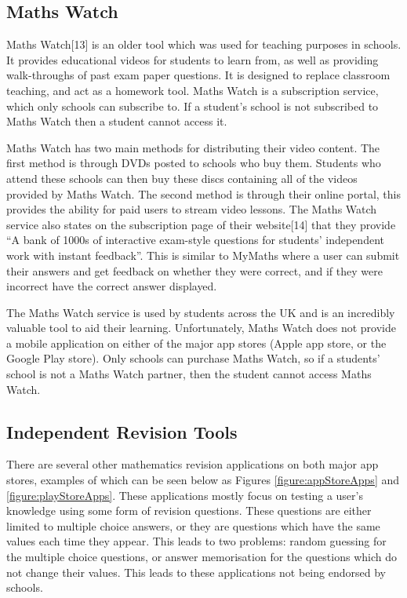 \documentclass{article}
\begin{document}
\subsection{Maths Watch}

Maths Watch[13] is an older tool which was used for teaching purposes in schools. It provides educational videos for students to learn from, as well as providing walk-throughs of past exam paper questions. It is designed to replace classroom teaching, and act as a homework tool. Maths Watch is a subscription service, which only schools can subscribe to. If a student's school is not subscribed to Maths Watch then a student cannot access it. \par

Maths Watch has two main methods for distributing their video content. The first method is through DVDs posted to schools who buy them. Students who attend these schools can then buy these discs containing all of the videos provided by Maths Watch. The second method is through their online portal, this provides the ability for paid users to stream video lessons. The Maths Watch service also states on the subscription page of their website[14] that they provide ``A bank of 1000s of interactive exam-style questions for students' independent work with instant feedback''. This is similar to MyMaths where a user can submit their answers and get feedback on whether they were correct, and if they were incorrect have the correct answer displayed. \par

The Maths Watch service is used by students across the UK and is an incredibly valuable tool to aid their learning. Unfortunately, Maths Watch does not provide a mobile application on either of the major app stores (Apple app store, or the Google Play store). Only schools can purchase Maths Watch, so if a students' school is not a Maths Watch partner, then the student cannot access Maths Watch. \par

\subsection{Independent Revision Tools}

There are several other mathematics revision applications on both major app stores, examples of which can be seen below as Figures \ref{figure:appStoreApps} and \ref{figure:playStoreApps}. These applications mostly focus on testing a user's knowledge using some form of revision questions. These questions are either limited to multiple choice answers, or they are questions which have the same values each time they appear. This leads to two problems: random guessing for the multiple choice questions, or answer memorisation for the questions which do not change their values. This leads to these applications not being endorsed by schools. \par
\end{document}
